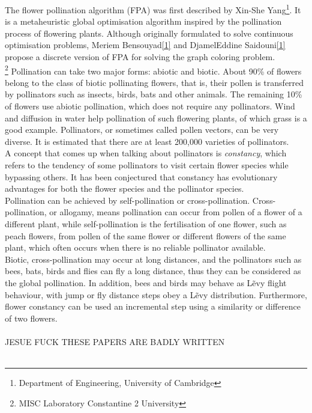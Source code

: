The flower pollination algorithm\cite{yang2012flower} (FPA) was first described by Xin-She Yang\footnote{Department of Engineering, University of Cambridge}. It is a metaheuristic global optimisation algorithm inspired by the pollination process of flowering plants. Although originally formulated to solve continuous optimisation problems, Meriem Bensouyad\ref{1} and DjamelEddine Saidouni\ref{1} propose a discrete version of FPA for solving the graph coloring problem\cite{7175923}.\\
\footnote{MISC Laboratory Constantine 2 University}\label{1}
Pollination can take two major forms: abiotic and biotic. About 90\% of flowers belong to the class of biotic pollinating flowers, that is, their pollen is transferred by pollinators such as insects, birds, bats and other animals. The remaining 10\% of flowers use abiotic pollination, which does not require any pollinators. Wind and diffusion in water help pollination of such flowering plants, of which grass is a good example. Pollinators, or sometimes called pollen vectors, can be very diverse. It is estimated that there are at least 200,000 varieties of pollinators.\\
A concept that comes up when talking about pollinators is \emph{constancy}, which refers to the tendency of some pollinators to visit certain flower species while bypassing others. It has been conjectured that constancy has evolutionary advantages for both the flower species and the pollinator species.\\
Pollination can be achieved by self-pollination or cross-pollination. Cross-pollination, or allogamy, means pollination can occur from pollen of a flower of a different plant, while self-pollination is the fertilisation of one flower, such as peach flowers, from pollen of the same flower or different flowers of the same plant, which often occurs when there is no reliable pollinator available. %
\\
Biotic, cross-pollination may occur at long distances, and the pollinators such as bees, bats, birds and flies can fly a long distance, thus they can be considered as the global pollination. In addition, bees and birds may behave as L\~evy flight behaviour, with jump or fly distance steps obey a L\~evy distribution. Furthermore, flower constancy can be used an incremental step using a similarity or difference of two flowers.\\~\\
JESUE FUCK THESE PAPERS ARE BADLY WRITTEN\\~\\

